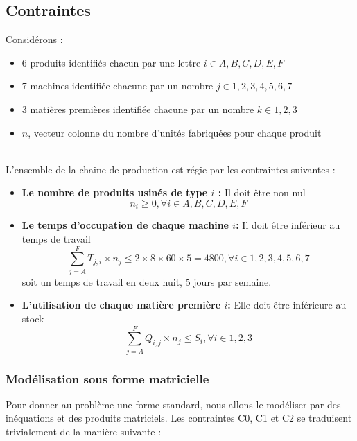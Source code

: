 \subsection{Contraintes}
Considérons :
\begin{itemize}
  \item 6 produits identifiés chacun par une lettre $i \in {A, B, C, D, E, F}$
  \item 7 machines identifiée chacune par un nombre $j \in {1, 2, 3, 4, 5, 6 ,7}$
  \item 3 matières premières identifiée chacune par un nombre $k \in {1, 2, 3}$
  \item $n$, vecteur colonne du nombre d'unités fabriquées pour chaque produit
\end{itemize}
~\\
L'ensemble de la chaine de production est régie par les contraintes suivantes
:\\
\begin{itemize}
  \item \textbf{Le nombre de produits usinés de type $i$ :} Il doit être non nul
  \begin{equation} 
  	n_i \ge 0, \forall i \in {A, B, C, D, E, F} \label{C0}
  \end{equation}
  
  \item \textbf{Le temps d'occupation de chaque machine $i$:} Il doit être
  inférieur au temps de travail
  \begin{equation} 
  	\sum_{j = A}^{F} T_{j,i} \times n_j \leq 2 \times 8 \times 60 \times 5 = 4800, \forall i \in {1, 2, 3, 4, 5, 6 ,7} \label{C1}
  \end{equation} 
  soit un temps de travail en deux huit, 5 jours par semaine.
  
  \item \textbf{L'utilisation de chaque matière première  $i$:} Elle doit être
  inférieure au stock
  \begin{equation} 
  	\sum_{j = A}^{F} Q_{i,j} \times n_j \leq S_i, \forall i \in {1,2,3} \label{C2}
  \end{equation} 
\end{itemize}

\newpage
\subsubsection{Modélisation sous forme matricielle}
Pour donner au problème une forme standard, nous allons le modéliser par des inéquations et des produits matriciels.
Les contraintes C0, C1 et C2 se traduisent trivialement de la manière suivante :

